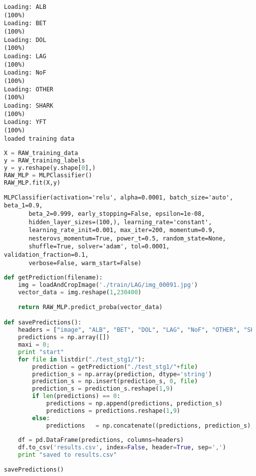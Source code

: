 \begin{lstlisting}
Loading: ALB
(100%)                      
Loading: BET
(100%)                         
Loading: DOL
(100%)                         
Loading: LAG
(100%)                             
Loading: NoF
(100%)                             
Loading: OTHER
(100%)                             
Loading: SHARK
(100%)                             
Loading: YFT
(100%)                                  
loaded training data
\end{lstlisting}

\begin{lstlisting}[language=Python]
X = RAW_training_data
y = RAW_training_labels
y = y.reshape(y.shape[0],)
RAW_MLP = MLPClassifier()
RAW_MLP.fit(X,y)
\end{lstlisting}

\begin{lstlisting}
MLPClassifier(activation='relu', alpha=0.0001, batch_size='auto', beta_1=0.9,
       beta_2=0.999, early_stopping=False, epsilon=1e-08,
       hidden_layer_sizes=(100,), learning_rate='constant',
       learning_rate_init=0.001, max_iter=200, momentum=0.9,
       nesterovs_momentum=True, power_t=0.5, random_state=None,
       shuffle=True, solver='adam', tol=0.0001, validation_fraction=0.1,
       verbose=False, warm_start=False)
\end{lstlisting}

\begin{lstlisting}[language=Python]
def getPrediction(filename):
    img = loadAndCropImage('./train/LAG/img_00091.jpg')
    vector_data = img.reshape(1,230400) 
    
    return RAW_MLP.predict_proba(vector_data)

def savePredictions():
    headers = ["image", "ALB", "BET", "DOL", "LAG", "NoF", "OTHER", "SHARK", "YFT"]
    predictions = np.array([])
    maxi = 0;
    print "start"
    for file in listdir("./test_stg1/"):
        prediction = getPrediction("./test_stg1/"+file)
        prediction_s = np.array(prediction, dtype='string')
        prediction_s = np.insert(prediction_s, 0, file)
        prediction_s = prediction_s.reshape(1,9)
        if len(predictions) == 0:
            predictions = np.append(predictions, prediction_s)
            predictions = predictions.reshape(1,9)
        else:
            predictions   = np.concatenate((predictions, prediction_s), axis=0)
    
    df = pd.DataFrame(predictions, columns=headers)
    df.to_csv('results.csv', index=False, header=True, sep=',')
    print "saved to results.csv"
    
savePredictions()
        
\end{lstlisting}


